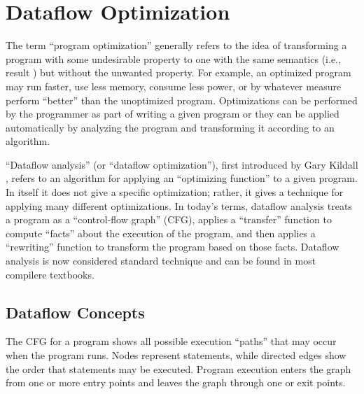 \documentclass[12pt]{report}
\begin{document}


\renewcommand{\textfraction}{0.1}
\renewcommand{\topfraction}{0.9}

\chapter{Dataflow Optimization}



The term ``program optimization'' generally refers to the idea of
transforming a program with some undesirable property to one with the
same semantics (i.e., result ) but without the unwanted property.  For
example, an optimized program may run faster, use less memory, consume
less power, or by whatever measure perform ``better'' than the
unoptimized program. Optimizations can be performed by the programmer
as part of writing a given program or they can be applied
automatically by analyzing the program and transforming it according
to an algorithm.

``Dataflow analysis'' (or ``dataflow optimization''), first introduced
by Gary Kildall \citep{Kildall1973}, refers to an algorithm for
applying an ``optimizing function'' to a given program. In itself it
does not give a specific optimization; rather, it gives a technique
for applying many different optimizations. In today's terms, dataflow
analysis treats a program as a ``control-flow graph'' (CFG), applies a
``transfer'' function to compute ``facts'' about the execution of the
program, and then applies a ``rewriting'' function to transform the
program based on those facts. Dataflow analysis is now considered
standard technique and can be found in most compilere textbooks.

\section{Dataflow Concepts}

The CFG for a program shows all possible execution ``paths'' that may
occur when the program runs. Nodes represent statements, while
directed edges show the order that statements may be executed.
Program execution enters the graph from one or more entry points and
leaves the graph through one or exit points.  
\end{document}
